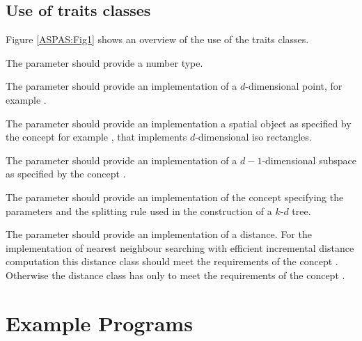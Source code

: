 







\subsection{Use of traits classes}

Figure \ref{ASPAS:Fig1} shows an overview of the use of the traits classes.

The parameter  should provide a number type.

The parameter  should provide an implementation of a $d$-dimensional point, 
for example .

The parameter  should provide an implementation a spatial object
as specified by the concept 
for example , that implements $d$-dimensional iso rectangles.

The parameter  should provide an implementation of a $d-1$-dimensional
subspace as specified by the concept .

The parameter  should provide an implementation of the concept 
specifying the parameters and the splitting rule used in the construction of a $k$-$d$ tree.

The parameter  should provide an implementation of a distance.
For the implementation of nearest neighbour searching with efficient incremental
distance computation this distance class should meet the requirements of the concept
. Otherwise the distance class has only to meet the
requirements of the concept .

\section{Example Programs}

